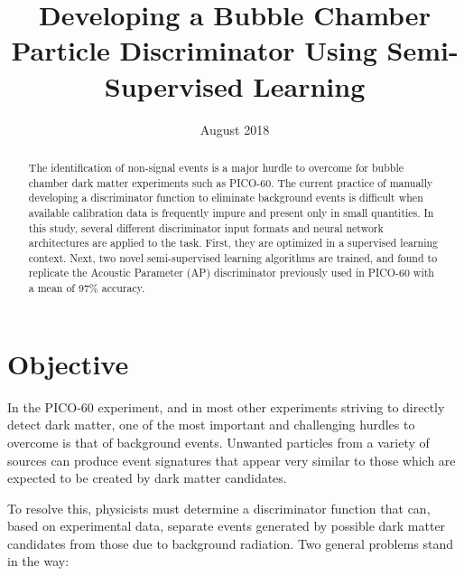 \documentclass[10pt]{article}
\begin{document}
\title{Developing a Bubble Chamber Particle Discriminator Using Semi-Supervised Learning}

\date{August 2018}
\maketitle

\begin{abstract}
    The identification of non-signal events is a major hurdle to overcome for bubble chamber dark matter experiments such as PICO-60. The current practice of manually developing a discriminator function to eliminate background events is difficult when available calibration data is frequently impure and present only in small quantities. In this study, several different discriminator input formats and neural network architectures are applied to the task. First, they are optimized in a supervised learning context. Next, two novel semi-supervised learning algorithms are trained, and found to replicate the Acoustic Parameter (AP) discriminator previously used in PICO-60 with a mean of 97\% accuracy.
\end{abstract}

\section{Objective}

In the PICO-60 experiment, and in most other experiments striving to directly detect dark matter, one of the most important and challenging hurdles to overcome is that of background events. Unwanted particles from a variety of sources can produce event signatures that appear very similar to those which are expected to be created by dark matter candidates.

To resolve this, physicists must determine a discriminator function that can, based on experimental data, separate events generated by possible dark matter candidates from those due to background radiation. Two general problems stand in the way:
\end{document}
